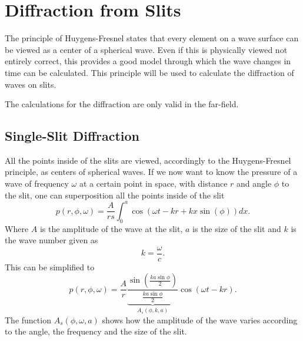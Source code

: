 \section{Diffraction from Slits}
The principle of Huygens-Fresnel \cite{physik_skript} states that every element on a wave surface can be viewed as a center of a spherical wave. Even if this is physically viewed not entirely correct, this provides a good model through which the wave changes in time can be calculated. This principle will be used to calculate the diffraction of waves on slits.

The calculations for the diffraction are only valid in the far-field. 
\subsection{Single-Slit Diffraction}\label{2_subsec:single_slit}
All the points inside of the slits are viewed, accordingly to the Huygens-Fresnel principle, as centers of spherical waves. 
If we now want to know the pressure of a wave of frequency $\omega$ at a certain point in space, with distance $r$ and angle $\phi$ to the slit, one can superposition all the points inside of the slit \cite{physik_skript}
\begin{equation}
    p(r, \phi, \omega)  
    = 
    \frac{A}{rs}\int_0^a \cos \left ( \omega t - k r + k x \sin\left ( \phi\right )\right) dx.
\end{equation}
Where $A$ is the amplitude of the wave at the slit, $a$ is the size of the slit and $k$ is the wave number given as
\begin{equation}
    k 
    = 
    \frac{\omega}{c}.
\end{equation}
This can be simplified to
\begin{equation}
     p(r, \phi, \omega) 
     = 
     \frac{A}{r}  \underbrace{\frac{\sin \left ( \frac{ka \sin \phi}{2}\right )}{ \frac{ka \sin \phi}{2}}}_{A_s(\phi,k,a)} \cos \left ( \omega t - k r\right ).
     \label{2_eq:single_slid_final}
\end{equation}
The function $A_s(\phi,\omega,a)$ shows how the amplitude of the wave varies according to the angle, the frequency and the size of the slit. 

